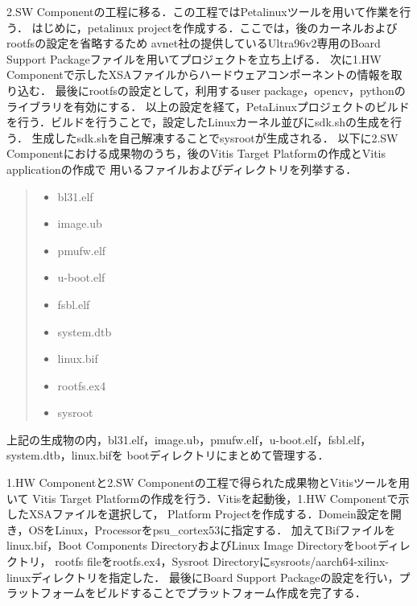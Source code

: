 \documentclass[11pt,a4j]{jreport}
\begin{document}
2.SW Componentの工程に移る．この工程ではPetalinuxツールを用いて作業を行う．
はじめに，petalinux projectを作成する．ここでは，後のカーネルおよびrootfsの設定を省略するため
avnet社の提供しているUltra96v2専用のBoard Support Packageファイルを用いてプロジェクトを立ち上げる．
次に1.HW Componentで示したXSAファイルからハードウェアコンポーネントの情報を取り込む．
最後にrootfsの設定として，利用するuser package，opencv，pythonのライブラリを有効にする．
以上の設定を経て，PetaLinuxプロジェクトのビルドを行う．ビルドを行うことで，設定したLinuxカーネル並びにsdk.shの生成を行う．
生成したsdk.shを自己解凍することでsysrootが生成される．
以下に2.SW Componentにおける成果物のうち，後のVitis Target Platformの作成とVitis applicationの作成で
用いるファイルおよびディレクトリを列挙する．
\begin{quote}
  \begin{itemize}
    \item bl31.elf
    \item image.ub
    \item pmufw.elf
    \item u-boot.elf
    \item fsbl.elf
    \item system.dtb
    \item linux.bif
    \item rootfs.ex4
    \item sysroot
  \end{itemize}
\end{quote}
上記の生成物の内，bl31.elf，image.ub，pmufw.elf，u-boot.elf，fsbl.elf，system.dtb，linux.bifを
bootディレクトリにまとめて管理する．

1.HW Componentと2.SW Componentの工程で得られた成果物とVitisツールを用いて
Vitis Target Platformの作成を行う．Vitisを起動後，1.HW Componentで示したXSAファイルを選択して，
Platform Projectを作成する．Domein設定を開き，OSをLinux，Processorをpsu_cortex53に指定する．
加えてBifファイルをlinux.bif，Boot Components DirectoryおよびLinux Image Directoryをbootディレクトリ，
rootfs fileをrootfs.ex4，Sysroot Directoryにsysroots/aarch64-xilinx-linuxディレクトリを指定した．
最後にBoard Support Packageの設定を行い，プラットフォームをビルドすることでプラットフォーム作成を完了する．
\end{document}
